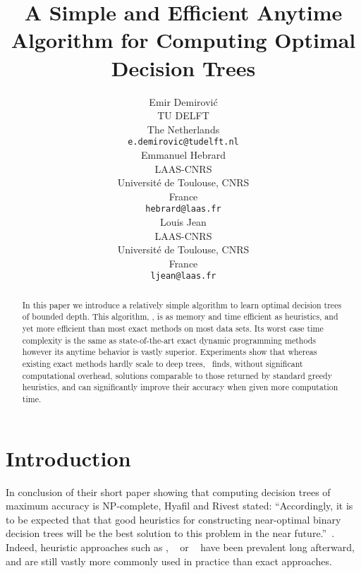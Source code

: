 \documentclass{article}
\title{A Simple and Efficient Anytime Algorithm for Computing Optimal Decision Trees}
\author{%
  Emir Demirovi\'c \\
  TU DELFT \\
	The Netherlands \\
  \texttt{e.demirovic@tudelft.nl} \\
	\And
	Emmanuel Hebrard \\
	LAAS-CNRS \\
	Universit\'e de Toulouse, CNRS \\
	France \\
	\texttt{hebrard@laas.fr} \\
	\And
	Louis Jean \\
	LAAS-CNRS \\
	Universit\'e de Toulouse, CNRS \\
	France \\
	\texttt{ljean@laas.fr} \\
}
\begin{document}
\maketitle






\begin{abstract}
	In this paper we introduce a relatively {simple} algorithm to learn optimal decision trees of bounded depth. This algorithm, \budalg, is as memory and time efficient as heuristics, and yet more efficient than most exact methods on most data sets. 
	Its worst case time complexity is the same as state-of-the-art exact dynamic programming methods however its anytime behavior is vastly superior.
	Experiments show that whereas existing exact methods hardly scale to deep trees, \budalg\ finds, without significant computational overhead, solutions comparable to those returned by standard greedy heuristics, and can significantly improve their accuracy when given more computation time.
	
\end{abstract}



\section{Introduction}

In conclusion of their short paper showing that computing decision trees of maximum accuracy is NP-complete, Hyafil and Rivest stated: ``Accordingly, it is to be expected that that good heuristics for constructing near-optimal binary decision trees will be the best solution to this problem in the near future.''~\cite{NPhardTrees}. Indeed, heuristic approaches such as \cart\cite{breiman1984classification}, \idthree~\cite{10.1023/A:1022643204877} or \cfour~\cite{c4-5} have been prevalent long afterward, and are still vastly more commonly used in practice than exact approaches.
\end{document}
